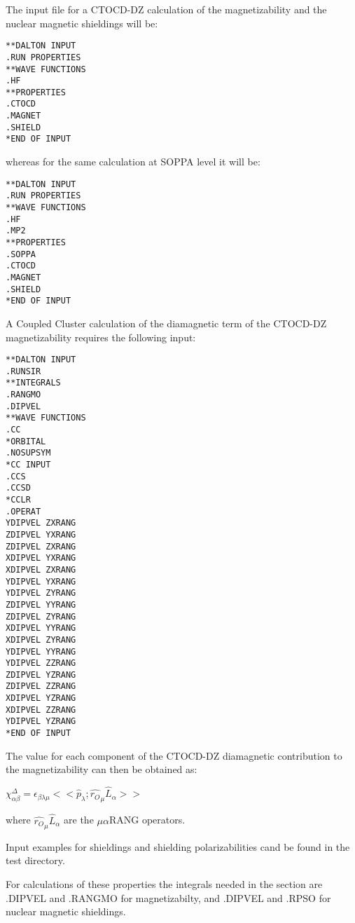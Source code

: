 The input file for a CTOCD-DZ calculation of the magnetizability and
the nuclear magnetic shieldings will be:

\begin{verbatim}
**DALTON INPUT
.RUN PROPERTIES
**WAVE FUNCTIONS
.HF
**PROPERTIES
.CTOCD
.MAGNET
.SHIELD
*END OF INPUT
\end{verbatim}

whereas for the same calculation at SOPPA level it will be:

\begin{verbatim}
**DALTON INPUT
.RUN PROPERTIES
**WAVE FUNCTIONS
.HF
.MP2
**PROPERTIES
.SOPPA
.CTOCD
.MAGNET
.SHIELD
*END OF INPUT
\end{verbatim}

A Coupled Cluster calculation of the diamagnetic term of the CTOCD-DZ magnetizability
requires the following input:

\begin{verbatim}
**DALTON INPUT
.RUNSIR
**INTEGRALS
.RANGMO
.DIPVEL
**WAVE FUNCTIONS
.CC
*ORBITAL
.NOSUPSYM
*CC INPUT
.CCS
.CCSD
*CCLR
.OPERAT
YDIPVEL ZXRANG
ZDIPVEL YXRANG
ZDIPVEL ZXRANG
XDIPVEL YXRANG
XDIPVEL ZXRANG
YDIPVEL YXRANG
YDIPVEL ZYRANG
ZDIPVEL YYRANG
ZDIPVEL ZYRANG
XDIPVEL YYRANG
XDIPVEL ZYRANG
YDIPVEL YYRANG
YDIPVEL ZZRANG
ZDIPVEL YZRANG
ZDIPVEL ZZRANG
XDIPVEL YZRANG
XDIPVEL ZZRANG
YDIPVEL YZRANG
*END OF INPUT
\end{verbatim}

The value for each component of the CTOCD-DZ diamagnetic contribution to the magnetizability 
can then be obtained as:
\begin{center}
$\chi_{\alpha\beta}^{\Delta} = \epsilon_{\beta\lambda\mu} 
<< \hat{p}_{\lambda} ; \hat{r_O}_{\mu}\hat{L}_{\alpha} >>$ 
\end{center}
where $\hat{r_O}_{\mu}\hat{L}_{\alpha}$ are the $\mu\alpha$RANG operators.

Input examples for shieldings and shielding polarizabilities cand be found in the test directory.

For  calculations of these properties the integrals needed in the  
section are .DIPVEL and .RANGMO for magnetizabilty, and .DIPVEL and .RPSO for nuclear magnetic 
shieldings.

